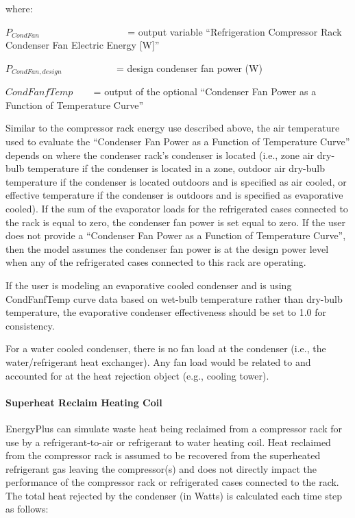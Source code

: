 where:

\({P_{CondFan}}\) ~~~~~~~~~~~~~~~~~ = output variable ``Refrigeration Compressor Rack Condenser Fan Electric Energy {[}W{]}''

\({P_{CondFan,design}}\) ~~~~~~~~~~ = design condenser fan power (W)

\(CondFanfTemp\) ~~~ = output of the optional ``Condenser Fan Power as a Function of Temperature Curve''

Similar to the compressor rack energy use described above, the air temperature used to evaluate the ``Condenser Fan Power as a Function of Temperature Curve'' depends on where the condenser rack's condenser is located (i.e., zone air dry-bulb temperature if the condenser is located in a zone, outdoor air dry-bulb temperature if the condenser is located outdoors and is specified as air cooled, or effective temperature if the condenser is outdoors and is specified as evaporative cooled). If the sum of the evaporator loads for the refrigerated cases connected to the rack is equal to zero, the condenser fan power is set equal to zero. If the user does not provide a ``Condenser Fan Power as a Function of Temperature Curve'', then the model assumes the condenser fan power is at the design power level when any of the refrigerated cases connected to this rack are operating.

If the user is modeling an evaporative cooled condenser and is using CondFanfTemp curve data based on wet-bulb temperature rather than dry-bulb temperature, the evaporative condenser effectiveness should be set to 1.0 for consistency.

For a water cooled condenser, there is no fan load at the condenser (i.e., the~ water/refrigerant heat exchanger). Any fan load would be related to and accounted for at the heat rejection object (e.g., cooling tower).

\paragraph{Superheat Reclaim Heating Coil}\label{superheat-reclaim-heating-coil}

EnergyPlus can simulate waste heat being reclaimed from a compressor rack for use by a refrigerant-to-air or refrigerant to water heating coil. Heat reclaimed from the compressor rack is assumed to be recovered from the superheated refrigerant gas leaving the compressor(s) and does not directly impact the performance of the compressor rack or refrigerated cases connected to the rack. The total heat rejected by the condenser (in Watts) is calculated each time step as follows:

